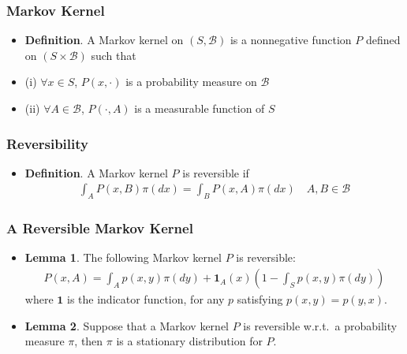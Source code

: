 \documentclass{beamer}
\begin{document}

\begin{frame}
	\frametitle{Markov Kernel}
	\begin{itemize}
	\item \textbf{Definition}. A Markov kernel on \((S,\mathcal{B})\) is a nonnegative function \(P\) defined on \((S \times \mathcal{B})\) such that
	\item (i) \(\forall x \in S\), \(P(x, \cdot)\) is a probability measure on \(\mathcal{B}\)
	\item (ii) \(\forall A \in \mathcal{B}\), \(P(\cdot, A)\) is a measurable function of \(S\) 
	\end{itemize}
\end{frame}


\begin{frame}
	\frametitle{Reversibility}
	\begin{itemize}
	\item \textbf{Definition}. A Markov kernel \(P\) is reversible if
	\begin{gather*}
	\int_A P(x,B) \pi(dx)
	=\int_B P(x,A) \pi(dx)
	\quad A,B \in \mathcal{B}
	\end{gather*}
	\end{itemize}
\end{frame}


\begin{frame}
	\frametitle{A Reversible Markov Kernel}
	\begin{itemize}
	\item \textbf{Lemma 1}. The following Markov kernel \(P\) is reversible:
	\begin{gather*}
    P(x,A)
    =\int_A p(x,y) \pi(dy)
    +\mathbf{1}_A(x) \left( 1 -\int_S p(x,y) \pi(dy) \right)
	\end{gather*}
	where \(\mathbf{1}\) is the indicator function, for any \(p\) satisfying \(p(x,y) =p(y,x)\).

	\item \textbf{Lemma 2}. Suppose that a Markov kernel \(P\) is reversible w.r.t.\ a probability measure \(\pi\), then \(\pi\) is a stationary distribution for \(P\).
	\end{itemize}
\end{frame}

\end{document}
